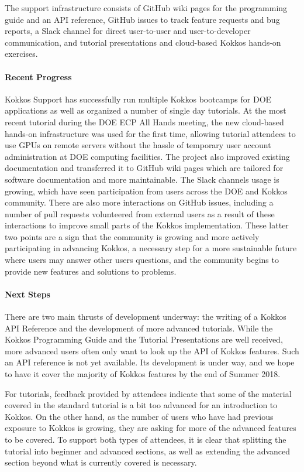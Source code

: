 The support infrastructure consists of GitHub wiki pages for the programming guide and an API reference, GitHub issues to track feature requests and bug reports, a Slack channel for direct user-to-user and user-to-developer communication, and tutorial presentations and cloud-based Kokkos hands-on exercises. 

\paragraph{Recent Progress}

Kokkos Support has successfully run multiple Kokkos bootcamps for DOE applications as well as organized a number of single day tutorials. 
At the most recent tutorial during the DOE ECP All Hands meeting, the new cloud-based hands-on infrastructure was used for the first time, allowing tutorial attendees to use GPUs on remote servers without the hassle of temporary user account administration at DOE computing facilities. 
The project also improved existing documentation and transferred it to GitHub wiki pages which are tailored for software documentation and more maintainable. 
The Slack channels usage is growing, which have seen participation from users across the DOE and Kokkos community. 
There are also more interactions on GitHub issues, including a number of pull requests volunteered from external users as a result of these interactions to improve small parts of the Kokkos implementation. 
These latter two points are a sign that the community is growing and more actively participating in advancing Kokkos, a necessary step for a more sustainable future where users may answer other users questions, and the community begins to provide new features and solutions to problems. 
 
\paragraph{Next Steps}

There are two main thrusts of development underway: the writing of a Kokkos API Reference and the development of more advanced tutorials. 
While the Kokkos Programming Guide and the Tutorial Presentations are well received, more advanced users often only want to look up the API of Kokkos features. 
Such an API reference is not yet available. Its development is under way, and we hope to have it cover the majority of Kokkos features by the end of Summer 2018. 

For tutorials, feedback provided by attendees indicate that some of the material covered in the standard tutorial is a bit too advanced for an introduction to Kokkos. On the other hand, as the number of users who have had previous exposure to Kokkos is growing, they are asking for more of the advanced features to be covered. To support both types of attendees, it is clear that splitting the tutorial into beginner and advanced sections, as well as extending the advanced section beyond what is currently covered is necessary. 


